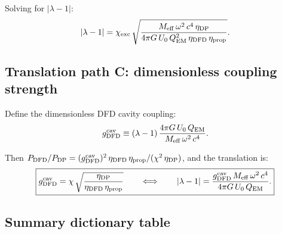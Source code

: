 \documentclass[11pt]{article}
\newcommand{\lam}{\lambda}
\newcommand{\lbone}{|\lambda - 1|}
\newcommand{\Meff}{M_{\rm eff}}
\newcommand{\QEM}{Q_{\rm EM}}
\theoremstyle{definition}
\theoremstyle{remark}
\begin{document}
Solving for $\lbone$:
\begin{equation}
\lbone = \chi_{\rm exc}\,
\sqrt{\frac{\Meff\,\omega^2\,c^4\,\eta_{\rm DP}}
{4\pi G\,U_0\,\QEM^2\,\eta_{\rm DFD}\,\eta_{\rm prop}}}.
\label{eq:lam_from_chi}
\end{equation}

\subsection{Translation path C: dimensionless coupling strength}

Define the dimensionless DFD cavity coupling:
\begin{equation}
g_{\rm DFD}^{\rm cav} \equiv (\lam-1)\,\frac{4\pi G\,U_0\,\QEM}
{\Meff\,\omega^2\,c^4}.
\label{eq:g_DFD}
\end{equation}

Then $P_{\rm DFD}/P_{\rm DP} = (g_{\rm DFD}^{\rm cav})^2\,
\eta_{\rm DFD}\,\eta_{\rm prop}/(\chi^2\,\eta_{\rm DP})$, and
the translation is:
\begin{equation}
\boxed{
g_{\rm DFD}^{\rm cav} = \chi\,
\sqrt{\frac{\eta_{\rm DP}}{\eta_{\rm DFD}\,\eta_{\rm prop}}}
\qquad\Longleftrightarrow\qquad
\lbone = \frac{g_{\rm DFD}^{\rm cav}\,\Meff\,\omega^2\,c^4}
{4\pi G\,U_0\,\QEM}.
}
\label{eq:g_translation}
\end{equation}

\subsection{Summary dictionary table}
\end{document}

